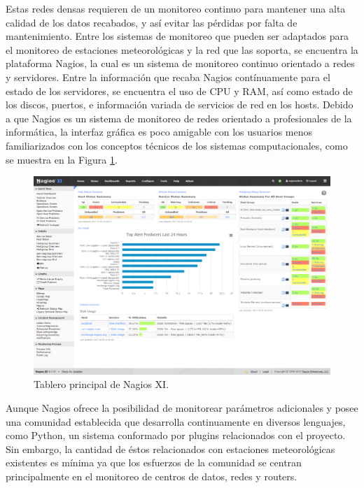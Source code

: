 
Estas redes densas requieren de un monitoreo continuo para mantener una alta calidad de los datos recabados, y así evitar las pérdidas por falta de mantenimiento. Entre los sistemas de monitoreo que pueden ser adaptados para el monitoreo de estaciones meteorológicas y la red que las soporta, se encuentra la plataforma Nagios, la cual es un sistema de monitoreo continuo orientado a redes y servidores. Entre la información que recaba Nagios contínuamente para el estado de los servidores, se encuentra el uso de CPU y RAM, así como estado de los discos, puertos, e información variada de servicios de red en los hosts. Debido a que Nagios es un sistema de monitoreo de redes orientado a profesionales de la informática, la interfaz gráfica es poco amigable con los usuarios menos familiarizados con los conceptos técnicos de los sistemas computacionales, como se muestra en la Figura \ref{fig:nagios_dashboard}.

\begin{figure}[!ht]
	\centering
	\includegraphics[width=1\linewidth]{images/Nagios_home_dashboard.png}
	\caption{Tablero principal de Nagios XI.}
	\label{fig:nagios_dashboard}
\end{figure}

Aunque Nagios ofrece la posibilidad de monitorear parámetros adicionales y posee una comunidad establecida que desarrolla continuamente en diversos lenguajes, como Python, un sistema conformado por plugins relacionados con el proyecto. Sin embargo, la cantidad de éstos relacionados con estaciones meteorológicas existentes es mínima ya que los esfuerzos de la comunidad se centran principalmente en el monitoreo de centros de datos, redes y routers.

